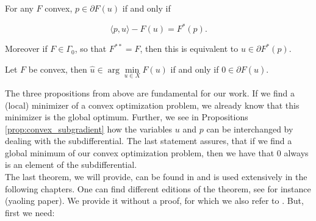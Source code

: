     \begin{proposition} %
    \label{prop:convex_subgradient}
        
        For any $F$ convex, $p \in \partial F(u)$ if and only if

            $$
                \langle p, u \rangle - F(u) = F^{\ast}(p).
            $$

        Moreover if $F \in \Gamma_{0}$, so that $F^{\ast\ast} = F$, then this is equivalent to $u \in \partial F^{\ast}(p)$.

    \end{proposition}

    \begin{proposition} %
    \label{prop:zero_element_of_subgradient}
        
        Let $F$ be convex, then $\hat{u} \in \arg \min\limits_{u \in X} F(u)$ if and only if $0 \in \partial F(\hat{u})$.

    \end{proposition}

    The three propositions from above are fundamental for our work. If we find a (local) minimizer of a convex optimization problem, we already know that this minimizer is the global optimum. Further, we see in Propositions \ref{prop:convex_subgradient} how the variables $u$ and $p$ can be interchanged by dealing with the subdifferential. The last statement assures, that if we find a global minimum of our convex optimization problem, then we have that $0$ always is an element of the subdifferential.\\ 
    The last theorem, we will provide, can be found in \cite{Rockafellar} and is used extensively in the following chapters. One can find different editions of the theorem, see for instance (yaoling paper). We provide it without a proof, for which we also refer to \cite{Rockafellar}. But, first we need:

